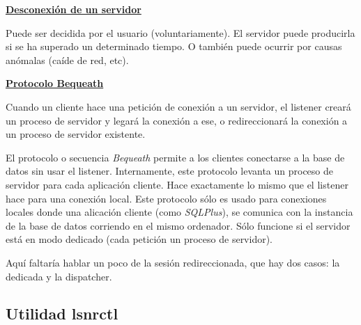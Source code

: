 \underline{\textbf{Desconexión de un servidor}}

Puede ser decidida por el usuario (voluntariamente). El servidor puede producirla si se ha superado un determinado tiempo. O también puede ocurrir por causas anómalas (caíde de red, etc).

\underline{\textbf{Protocolo Bequeath}}

Cuando un cliente hace una petición de conexión a un servidor, el listener creará un proceso de servidor y legará la conexión a ese, o redireccionará la conexión a un proceso de servidor existente.

El protocolo o secuencia \textit{Bequeath} permite a los clientes conectarse a la base de datos sin usar el listener. Internamente, este protocolo levanta un proceso de servidor para cada aplicación cliente. Hace exactamente lo mismo que el listener hace para una conexión local. Este protocolo sólo es usado para conexiones locales donde una alicación cliente (como \textit{SQLPlus}), se comunica con la instancia de la base de datos corriendo en el mismo ordenador. Sólo funcione si el servidor está en modo dedicado (cada petición un proceso de servidor).

Aquí faltaría hablar un poco de la sesión redireccionada, que hay dos casos: la dedicada y la dispatcher.

\subsection{Utilidad lsnrctl}

